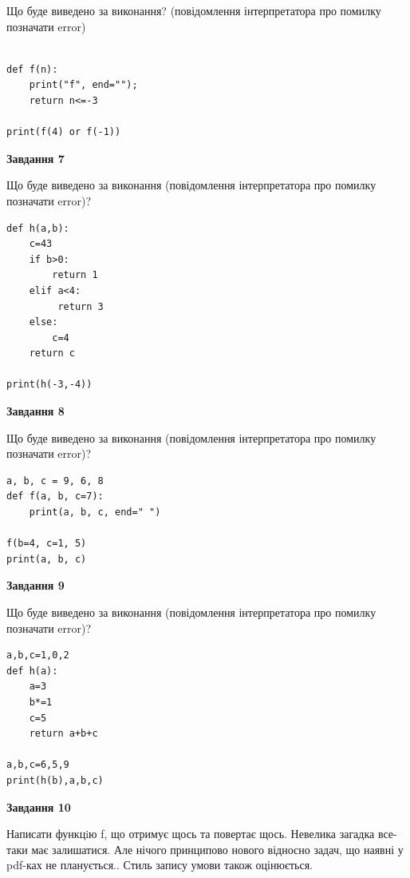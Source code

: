 \documentclass[12pt, ukrainian]{article}
\begin{document}
{\begin {large}
Що буде виведено за виконання? (повідомлення інтерпретатора про помилку позначати error)\par
\begin{verbatim}

def f(n):
    print("f", end="");
    return n<=-3

print(f(4) or f(-1))
\end{verbatim}

{\begin {center}\textbf{Завдання 7}\end {center}}

Що буде виведено за виконання (повідомлення інтерпретатора про помилку позначати error)?\par
\begin{verbatim}
def h(a,b):
    c=43
    if b>0:
        return 1
    elif a<4:
         return 3
    else: 
        c=4
    return c

print(h(-3,-4))
\end{verbatim}

{\begin {center}\textbf{Завдання 8}\end {center}}

Що буде виведено за виконання (повідомлення інтерпретатора про помилку позначати error)?\par
\begin{verbatim}
a, b, c = 9, 6, 8
def f(a, b, c=7):
    print(a, b, c, end=" ")

f(b=4, c=1, 5)
print(a, b, c)
\end{verbatim}

{\begin {center}\textbf{Завдання 9}\end {center}}

Що буде виведено за виконання (повідомлення інтерпретатора про помилку позначати error)?\par
\begin{verbatim}
a,b,c=1,0,2
def h(a):
    a=3
    b*=1
    c=5
    return a+b+c

a,b,c=6,5,9
print(h(b),a,b,c)
\end{verbatim}

{\begin {center}\textbf{Завдання 10}\end {center}}


Написати функцiю f, що отримує щось та повертає щось. Невелика загадка все-таки має залишатися. Але нічого принципово нового відносно задач, що наявні у pdf-ках не планується.. Стиль запису умови також оцінюється.\par
\end {large}}
\newpage
\end{document}
